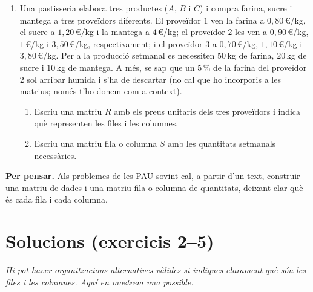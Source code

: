\documentclass[12pt,a4paper]{article}
\newcommand{\blocInici}{%
  \par\nobreak\vspace{0pt}%
  \begin{minipage}[t]{\linewidth}%
}
\newcommand{\blocFi}{%
  \end{minipage}%
  \par
}
\begin{document}
\begin{enumerate}[leftmargin=*,itemsep=0.55em,parsep=0.2em]
\item
{}%
\blocInici
Una pastisseria elabora tres productes ($A$, $B$ i $C$) i compra farina, sucre i mantega
a tres proveïdors diferents.
El proveïdor $1$ ven la farina a $0{,}80$\,\euro{}/kg, el sucre a $1{,}20$\,\euro{}/kg
i la mantega a $4$\,\euro{}/kg;
el proveïdor $2$ les ven a $0{,}90$\,\euro{}/kg, $1$\,\euro{}/kg i $3{,}50$\,\euro{}/kg, respectivament;
i el proveïdor $3$ a $0{,}70$\,\euro{}/kg, $1{,}10$\,\euro{}/kg i $3{,}80$\,\euro{}/kg.
Per a la producció setmanal es necessiten $50$\,kg de farina, $20$\,kg de sucre i $10$\,kg de mantega.
A més, se sap que un $5\,\%$ de la farina del proveïdor $2$ sol arribar humida
i s'ha de descartar (no cal que ho incorporis a les matrius;
només t'ho donem com a context).
\begin{enumerate}[label=\alph*),leftmargin=1.4em,itemsep=0.25em]
  \item Escriu una matriu $R$ amb els preus unitaris dels tres proveïdors
    i indica què representen les files i les columnes.
  \item Escriu una matriu fila o columna $S$ amb les quantitats setmanals necessàries.
\end{enumerate}
\blocFi

\end{enumerate}

\vspace{0.5em}
\begin{tcolorbox}[
  colback=white,
  colframe=margueVerdClar,
  boxrule=0.7pt,
  arc=2pt,
  left=5pt, right=5pt, top=3pt, bottom=3pt,
  fontupper=\small
]
\textbf{Per pensar.}
Als problemes de les PAU sovint cal, a partir d'un text,
construir una matriu de dades i una matriu fila o columna de quantitats,
deixant clar què és cada fila i cada columna.
\end{tcolorbox}

\newpage
\section*{Solucions (exercicis 2--5)}
{\small\textit{Hi pot haver organitzacions alternatives vàlides si indiques clarament
què són les files i les columnes. Aquí en mostrem una possible.}}
\end{document}
